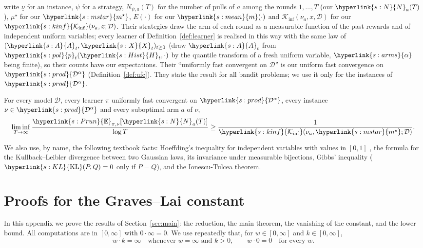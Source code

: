 \documentclass[11pt]{article}
\newcommand{\E}{\mathbb{E}}
\newcommand{\sy}[2]{{\hyperlink{#1}{#2}}}
\newcommand{\mean}{\sy{s:mean}{m}}
\newcommand{\KL}{\sy{s:KL}{\mathrm{KL}}}
\newcommand{\Kinf}{\sy{s:kinf}{\mathcal{K}_{\inf}}}
\newcommand{\arms}{\sy{s:arms}{\alpha}}
\newcommand{\ms}{\sy{s:mstar}{m^{\star}}}
\newcommand{\powc}[1]{\sy{s:prod}{#1^{\alpha}}}
\newcommand{\pol}{\sy{s:pol}{p}}
\newcommand{\Hist}{\sy{s:Hist}{H}}
\newcommand{\Ap}{\sy{s:A}{A}}
\newcommand{\Xr}{\sy{s:X}{X}}
\newcommand{\Er}{\sy{s:Prun}{\E}}
\newcommand{\Np}{\sy{s:N}{N}}
\begin{document}
\citet{GMS19} write $\underline\nu$ for an instance, $\psi$ for a strategy, $N_{\psi,a}(T)$ for the
number of pulls of $a$ among the rounds $1,\dots,T$ (our $\Np_a(T)$), $\mu^\star$ for our $\ms$,
$E(\cdot)$ for our $\mean(\cdot)$ and $\mathcal K_{\inf}(\nu_a,x,\mathcal D)$ for our
$\Kinf(\nu_a,x;\mathcal D)$. Their strategies draw the arm of each round as a measurable function of
the past rewards and of independent uniform variables; every learner of Definition~\ref{def:learner}
is realised in this way with the same law of $(\Ap_t,\Xr_t)_{t\ge0}$ (draw $\Ap_t$ from
$\pol_t(\Hist_t,\cdot)$ by the quantile transform of a fresh uniform variable, $\arms$ being finite),
so their counts have our expectations. Their ``uniformly fast convergent on $\mathcal D$'' is our
uniform fast convergence on $\powc{\mathcal D}$ (Definition~\ref{def:ufc}). They state the result for
all bandit problems; we use it only for the instances of $\powc{\mathcal D}$.

\begin{theorem}\label{cite:GMS19-thm1}
For every model $\mathcal D$, every learner $\pi$ uniformly fast convergent on $\powc{\mathcal D}$, every
instance $\nu\in\powc{\mathcal D}$ and every suboptimal arm $a$ of $\nu$,
\begin{equation*}
  \liminf_{T\to\infty}\frac{\Er_{\pi,\nu}[\Np_a(T)]}{\log T}\ge\frac{1}{\Kinf(\nu_a,\ms;\mathcal D)}.
\end{equation*}
\end{theorem}

We also use, by name, the following textbook facts: Hoeffding's inequality for independent
variables with values in $[0,1]$ \citep{H63}, the formula for the Kullback--Leibler divergence
between two Gaussian laws, its invariance under measurable bijections, Gibbs' inequality
($\KL(P,Q)=0$ only if $P=Q$), and the Ionescu-Tulcea theorem.

\section{Proofs for the Graves--Lai constant}\label{sec:proof-gl}

In this appendix we prove the results of Section~\ref{sec:main}: the reduction, the main theorem,
the vanishing of the constant, and the lower bound. All computations are in $[0,\infty]$ with
$0\cdot\infty=0$. We use repeatedly that, for $w\in[0,\infty]$ and $k\in[0,\infty]$,
\begin{equation}\label{eq:prod}
  w\cdot k=\infty\quad\text{whenever }w=\infty\text{ and }k>0,\qquad w\cdot0=0\quad\text{for every }w.
\end{equation}
\end{document}
